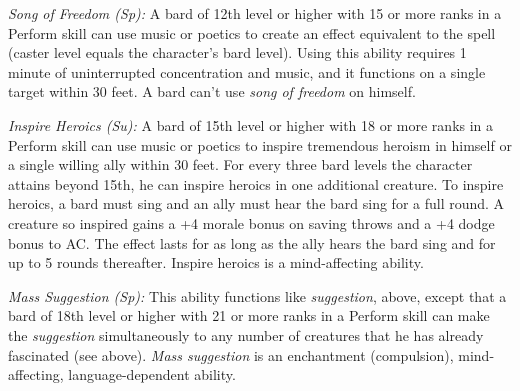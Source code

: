 \textit{Song of Freedom (Sp):} A bard of 12th level or higher with 15 or more ranks in a Perform skill can use music or poetics to create an effect equivalent to the  spell (caster level equals the character's bard level). Using this ability requires 1 minute of uninterrupted concentration and music, and it functions on a single target within 30 feet. A bard can't use \textit{song of freedom} on himself.

\textit{Inspire Heroics (Su):} A bard of 15th level or higher with 18 or more ranks in a Perform skill can use music or poetics to inspire tremendous heroism in himself or a single willing ally within 30 feet. For every three bard levels the character attains beyond 15th, he can inspire heroics in one additional creature. To inspire heroics, a bard must sing and an ally must hear the bard sing for a full round. A creature so inspired gains a +4 morale bonus on saving throws and a +4 dodge bonus to AC. The effect lasts for as long as the ally hears the bard sing and for up to 5 rounds thereafter. Inspire heroics is a mind-affecting ability.

\textit{Mass Suggestion (Sp):} This ability functions like \textit{suggestion}, above, except that a bard of 18th level or higher with 21 or more ranks in a Perform skill can make the \textit{suggestion} simultaneously to any number of creatures that he has already fascinated (see above). \textit{Mass suggestion} is an enchantment (compulsion), mind-affecting, language-dependent ability.
